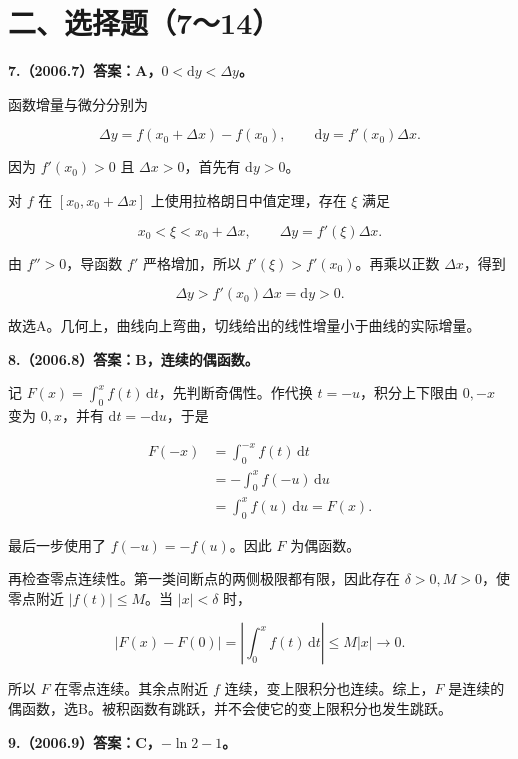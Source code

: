 \documentclass[UTF8,11pt,fontset=windows]{ctexart}
\begin{document}
\clearpage

\section*{二、选择题（7～14）}

\textbf{7.（2006.7）答案：A，$0<\mathrm dy<\Delta y$。}

函数增量与微分分别为

$$
\Delta y=f(x_0+\Delta x)-f(x_0),
\qquad
\mathrm dy=f'(x_0)\Delta x.
$$

因为 $f'(x_0)>0$ 且 $\Delta x>0$，首先有 $\mathrm dy>0$。

对 $f$ 在 $[x_0,x_0+\Delta x]$ 上使用拉格朗日中值定理，存在 $\xi$ 满足

$$
x_0<\xi<x_0+\Delta x,
\qquad
\Delta y=f'(\xi)\Delta x.
$$

由 $f''>0$，导函数 $f'$ 严格增加，所以 $f'(\xi)>f'(x_0)$。再乘以正数 $\Delta x$，得到

$$
\Delta y>f'(x_0)\Delta x=\mathrm dy>0.
$$

故选A。几何上，曲线向上弯曲，切线给出的线性增量小于曲线的实际增量。

\clearpage

\textbf{8.（2006.8）答案：B，连续的偶函数。}

记 $F(x)=\int_0^x f(t)\,\mathrm dt$，先判断奇偶性。作代换 $t=-u$，积分上下限由 $0,-x$ 变为 $0,x$，并有 $\mathrm dt=-\mathrm du$，于是

$$
\begin{aligned}
F(-x)&=\int_0^{-x}f(t)\,\mathrm dt\\
&=-\int_0^x f(-u)\,\mathrm du\\
&=\int_0^x f(u)\,\mathrm du=F(x).
\end{aligned}
$$

最后一步使用了 $f(-u)=-f(u)$。因此 $F$ 为偶函数。

再检查零点连续性。第一类间断点的两侧极限都有限，因此存在 $\delta>0,M>0$，使零点附近 $|f(t)|\le M$。当 $|x|<\delta$ 时，

$$
|F(x)-F(0)|
=\left|\int_0^x f(t)\,\mathrm dt\right|
\le M|x|\longrightarrow0.
$$

所以 $F$ 在零点连续。其余点附近 $f$ 连续，变上限积分也连续。综上，$F$ 是连续的偶函数，选B。被积函数有跳跃，并不会使它的变上限积分也发生跳跃。

\clearpage

\textbf{9.（2006.9）答案：C，$-\ln2-1$。}
\end{document}
